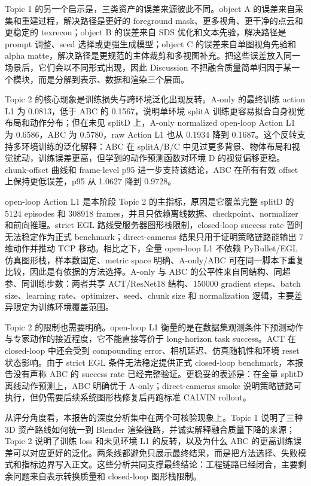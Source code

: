 \documentclass{article}
\begin{document}
	Topic 1 的另一个启示是，三类资产的误差来源彼此不同。object A 的误差来自采集和重建过程，解决路径是更好的 foreground mask、更多视角、更干净的点云和更稳定的 texrecon；object B 的误差来自 SDS 优化和文本先验，解决路径是 prompt 调整、seed 选择或更强生成模型；object C 的误差来自单图视角先验和 alpha matte，解决路径是更规范的主体裁剪和多视图补充。把这些误差放入同一场景后，它们会以不同形式出现，因此 Discussion 不把融合质量简单归因于某一个模块，而是分解到表示、数据和渲染三个层面。

	Topic 2 的核心现象是训练损失与跨环境泛化出现反转。A-only 的最终训练 action L1 为 0.0813，低于 ABC 的 0.1567，说明单环境 splitA 训练更容易拟合自身视觉布局和动作分布；但在未见 splitD 上，A-only normalized open-loop Action L1 为 0.6586，ABC 为 0.5780，raw Action L1 也从 0.1934 降到 0.1687。这个反转支持多环境训练的泛化解释：ABC 在 splitA/B/C 中见过更多背景、物体布局和视觉扰动，训练误差更高，但学到的动作预测函数对环境 D 的视觉偏移更稳。chunk-offset 曲线和 frame-level p95 进一步支持该结论，ABC 在所有有效 offset 上保持更低误差，p95 从 1.0627 降到 0.9728。

	open-loop Action L1 是本阶段 Topic 2 的主指标，原因是它覆盖完整 splitD 的 5124 episodes 和 308918 frames，并且只依赖离线数据、checkpoint、normalizer 和前向推理。strict EGL 路线受服务器图形栈限制，closed-loop success rate 暂时无法稳定作为正式 benchmark；direct-cameras 结果只用于证明策略链路能输出 7 维动作并推动 TCP 移动。相比之下，全量 open-loop L1 不依赖 PyBullet/EGL 仿真图形栈，样本数固定、metric space 明确、A-only/ABC 可在同一脚本下重复比较，因此是有依据的方法选择。A-only 与 ABC 的公平性来自同结构、同超参、同训练步数：两者共享 ACT/ResNet18 结构、150000 gradient steps、batch size、learning rate、optimizer、seed、chunk size 和 normalization 逻辑，主要差异限定为训练环境覆盖范围。

	Topic 2 的限制也需要明确。open-loop L1 衡量的是在数据集观测条件下预测动作与专家动作的接近程度，它不能直接等价于 long-horizon task success。ACT 在 closed-loop 中还会受到 compounding error、相机延迟、仿真随机性和环境 reset 状态影响。由于 strict EGL 条件无法稳定提供正式 closed-loop benchmark，本报告没有声称 ABC 的 success rate 已经完整验证。更稳妥的表述是：在全量 splitD 离线动作预测上，ABC 明确优于 A-only；direct-cameras smoke 说明策略链路可执行，但仍需要后续系统图形栈修复后再跑标准 CALVIN rollout。

	从评分角度看，本报告的深度分析集中在两个可核验现象上。Topic 1 说明了三种 3D 资产路线如何统一到 Blender 渲染链路，并诚实解释融合质量下降的来源；Topic 2 说明了训练 loss 和未见环境 L1 的反转，以及为什么 ABC 的更高训练误差可以对应更好的泛化。两条线都避免只展示最终结果，而是把方法选择、失败模式和指标边界写入正文。这些分析共同支撑最终结论：工程链路已经闭合，主要剩余问题来自表示转换质量和 closed-loop 图形栈限制。
\end{document}
